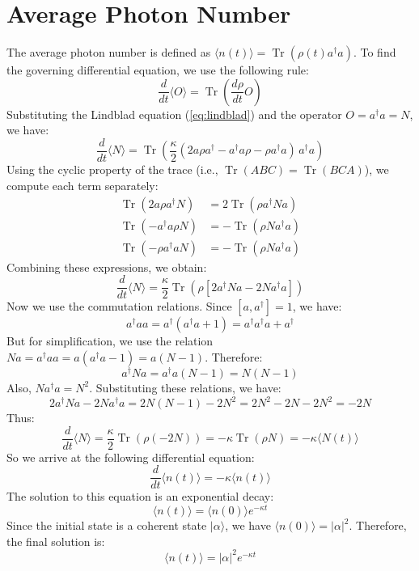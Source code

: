 \documentclass{article}
\begin{document}
\section{Average Photon Number}
The average photon number is defined as $\langle n(t) \rangle = \operatorname{Tr}(\rho(t) a^\dagger a)$. To find the governing differential equation, we use the following rule:
\[
\frac{d}{dt}\langle O \rangle = \operatorname{Tr}\left(\frac{d\rho}{dt} O \right)
\]
Substituting the Lindblad equation (\ref{eq:lindblad}) and the operator $O = a^\dagger a = N$, we have:
\[
\frac{d}{dt}\langle N \rangle = \operatorname{Tr}\left( \frac{\kappa}{2} (2a\rho a^\dagger - a^\dagger a \rho - \rho a^\dagger a) \, a^\dagger a \right)
\]
Using the cyclic property of the trace (i.e., $\operatorname{Tr}(ABC) = \operatorname{Tr}(BCA)$), we compute each term separately:
\begin{align*}
\operatorname{Tr}(2a\rho a^\dagger N) &= 2\operatorname{Tr}(\rho a^\dagger N a) \\
\operatorname{Tr}(-a^\dagger a \rho N) &= -\operatorname{Tr}(\rho N a^\dagger a) \\
\operatorname{Tr}(-\rho a^\dagger a N) &= -\operatorname{Tr}(\rho N a^\dagger a)
\end{align*}
Combining these expressions, we obtain:
\[
\frac{d}{dt}\langle N \rangle = \frac{\kappa}{2} \operatorname{Tr}\left( \rho \left[ 2a^\dagger N a - 2 N a^\dagger a \right] \right)
\]
Now we use the commutation relations. Since $[a, a^\dagger] = 1$, we have:
\[
a^\dagger a a = a^\dagger (a^\dagger a + 1) = a^\dagger a^\dagger a + a^\dagger
\]
But for simplification, we use the relation $N a = a^\dagger a a = a (a^\dagger a - 1) = a (N - 1)$. Therefore:
\[
a^\dagger N a = a^\dagger a (N - 1) = N (N - 1)
\]
Also, $N a^\dagger a = N^2$. Substituting these relations, we have:
\[
2a^\dagger N a - 2 N a^\dagger a = 2N(N - 1) - 2N^2 = 2N^2 - 2N - 2N^2 = -2N
\]
Thus:
\[
\frac{d}{dt}\langle N \rangle = \frac{\kappa}{2} \operatorname{Tr}\left( \rho (-2N) \right) = -\kappa \operatorname{Tr}(\rho N) = -\kappa \langle N(t) \rangle
\]
So we arrive at the following differential equation:
\begin{equation}
\frac{d}{dt}\langle n(t) \rangle = -\kappa \langle n(t) \rangle
\label{eq:diffeq}
\end{equation}
The solution to this equation is an exponential decay:
\[
\langle n(t) \rangle = \langle n(0) \rangle e^{-\kappa t}
\]
Since the initial state is a coherent state $\lvert \alpha \rangle$, we have $\langle n(0) \rangle = |\alpha|^2$. Therefore, the final solution is:
\begin{equation}
\boxed{\langle n(t) \rangle = |\alpha|^2 e^{-\kappa t}}
\label{eq:solution}
\end{equation}
\end{document}
